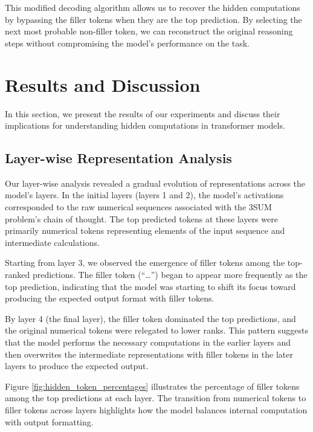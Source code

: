 \documentclass{article}
\begin{document}
This modified decoding algorithm allows us to recover the hidden computations by bypassing the filler tokens when they are the top prediction. By selecting the next most probable non-filler token, we can reconstruct the original reasoning steps without compromising the model's performance on the task.

\section{Results and Discussion}

In this section, we present the results of our experiments and discuss their implications for understanding hidden computations in transformer models.

\subsection{Layer-wise Representation Analysis}

Our layer-wise analysis revealed a gradual evolution of representations across the model's layers. In the initial layers (layers 1 and 2), the model's activations corresponded to the raw numerical sequences associated with the 3SUM problem's chain of thought. The top predicted tokens at these layers were primarily numerical tokens representing elements of the input sequence and intermediate calculations.

Starting from layer 3, we observed the emergence of filler tokens among the top-ranked predictions. The filler token (``\ldots'') began to appear more frequently as the top prediction, indicating that the model was starting to shift its focus toward producing the expected output format with filler tokens.

By layer 4 (the final layer), the filler token dominated the top predictions, and the original numerical tokens were relegated to lower ranks. This pattern suggests that the model performs the necessary computations in the earlier layers and then overwrites the intermediate representations with filler tokens in the later layers to produce the expected output.

Figure \ref{fig:hidden_token_percentages} illustrates the percentage of filler tokens among the top predictions at each layer. The transition from numerical tokens to filler tokens across layers highlights how the model balances internal computation with output formatting.
\end{document}
